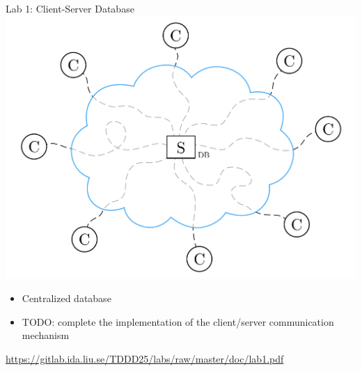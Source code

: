 \documentclass[compress,xcolor=table]{beamer}
\begin{document}
\begin{frame}{Lab 1: Client-Server Database}
  \centering
  \includegraphics[scale=0.10,page=1]{include/assets/single-server}
  \begin{itemize}
    \item Centralized database
    \item \alert{TODO}: complete the implementation of the client/server
    communication mechanism
  \end{itemize}
  \begin{center}
    \scriptsize \url{https://gitlab.ida.liu.se/TDDD25/labs/raw/master/doc/lab1.pdf}
  \end{center}
\end{frame}
\end{document}
